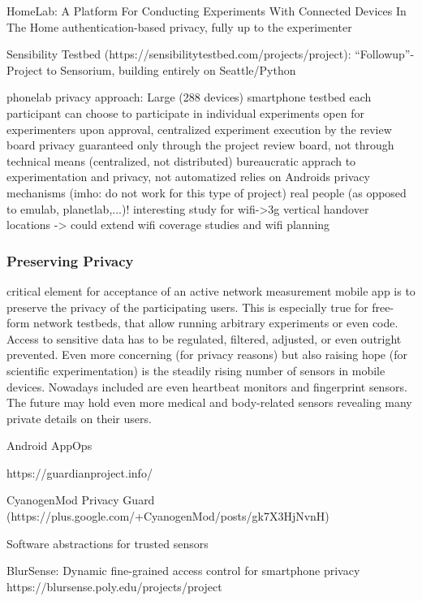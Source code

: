 
HomeLab: A Platform For Conducting Experiments With Connected Devices In The Home \cite{Singh:2013:HPC:2486001.2491701}
authentication-based privacy, fully up to the experimenter

Sensibility Testbed (https://sensibilitytestbed.com/projects/project): ``Followup''-Project to Sensorium, building entirely on Seattle/Python


phonelab privacy approach:
Large (288 devices) smartphone testbed
each participant can choose to participate in individual experiments
open for experimenters upon approval, centralized experiment execution by the review board
privacy guaranteed only through the project review board, not through technical means (centralized, not distributed)
bureaucratic apprach to experimentation and privacy, not automatized
relies on Androids privacy mechanisms (imho: do not work for this type of project)
real people (as opposed to emulab, planetlab,...)!
interesting study for wifi->3g vertical handover locations -> could extend wifi coverage studies and wifi planning

\subsubsection{Preserving Privacy}



critical element for acceptance of an active network measurement mobile app is to preserve the privacy of the participating users. This is especially true for free-form network testbeds, that allow running arbitrary experiments or even code. Access to sensitive data has to be regulated, filtered, adjusted, or even outright prevented. Even more concerning (for privacy reasons) but also raising hope (for scientific experimentation) is the steadily rising number of sensors in mobile devices. Nowadays included are even heartbeat monitors and fingerprint sensors. The future may hold even more medical and body-related sensors revealing many private details on their users.

Android AppOps

https://guardianproject.info/

CyanogenMod Privacy Guard (https://plus.google.com/+CyanogenMod/posts/gk7X3HjNvnH)

Software abstractions for trusted sensors \cite{Liu:2012:SAT:2307636.2307670}

BlurSense: Dynamic fine-grained access control for smartphone privacy~\cite{6798970}
https://blursense.poly.edu/projects/project

